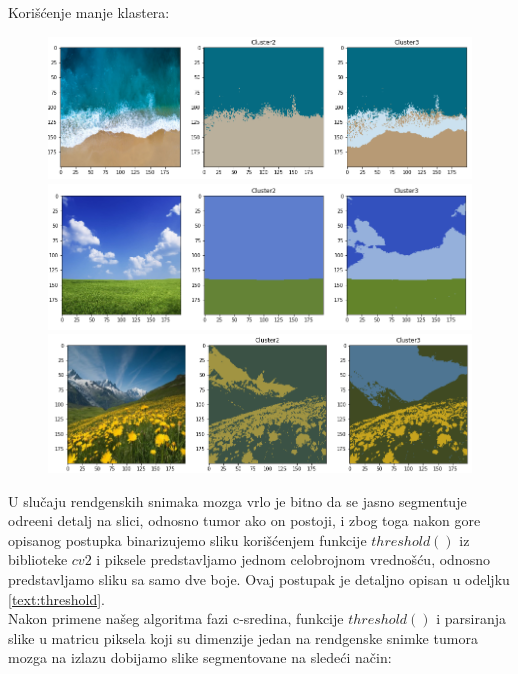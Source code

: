 \documentclass{article}
\begin{document}
Kori\v{s}\'{c}enje manje klastera:

\newpage

\begin{figure}[h!]
\centerline{\includegraphics[scale=0.45]{images/low_segmented_fuzzy_c_means0.png}}
\centerline{\includegraphics[scale=0.45]{images/low_segmented_fuzzy_c_means1.png}}
\centerline{\includegraphics[scale=0.45]{images/low_segmented_fuzzy_c_means2.png}}
\end{figure}

U slu\v{c}aju rendgenskih snimaka mozga vrlo je bitno da se jasno segmentuje odre\dj eni detalj na slici, odnosno tumor ako on postoji, i zbog toga nakon gore opisanog postupka binarizujemo sliku kori\v{s}\'{c}enjem funkcije $ threshold() $ iz biblioteke $ cv2 $ i piksele predstavljamo jednom celobrojnom vredno\v{s}\'{c}u, odnosno predstavljamo sliku sa samo dve boje. Ovaj postupak je detaljno opisan u odeljku \ref{text:threshold}.\\


Nakon primene na\v{s}eg algoritma fazi c-sredina, funkcije $ threshold() $ i parsiranja slike u matricu piksela koji su dimenzije jedan na rendgenske snimke tumora mozga na izlazu dobijamo slike segmentovane na slede\'{c}i na\v{c}in:
\end{document}
